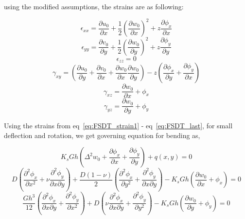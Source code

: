 using the modified assumptions, the strains are as following:

\begin{equation}
    \epsilon_{xx} = \frac{\partial u_0}{\partial x} + \frac{1}{2}(\frac{\partial w_0}{\partial x})^2 + z\frac{\partial\phi_x}{\partial x}
    \label{eq:FSDT_strain1}
\end{equation}
\begin{equation}
    \epsilon_{yy} = \frac{\partial v_0}{\partial y} + \frac{1}{2}(\frac{\partial w_0}{\partial y})^2 + z\frac{\partial\phi_y}{\partial y}
\end{equation}
\begin{equation}
    \epsilon_{zz} = 0
    \label{eq:strain_z_FSDT}
\end{equation}
\begin{equation}
    \gamma_{xy} = (\frac{\partial u_0}{\partial y} + \frac{\partial v_0}{\partial x} + \frac{\partial w_0}{\partial x}\frac{\partial w_0}{\partial y}) - z(\frac{\partial\phi_x}{\partial y} + \frac{\partial\phi_y}{\partial x})
\end{equation}
\begin{equation}
    \gamma_{xz} = \frac{\partial w_0}{\partial x} + \phi_x
\end{equation}
\begin{equation}
    \gamma_{yz} = \frac{\partial w_0}{\partial y} + \phi_y
    \label{eq:FSDT_last}
\end{equation}

Using the strains from eq~\ref{eq:FSDT_strain1} - eq~\ref{eq:FSDT_last}, for small deflection and rotation, we get governing equation for bending as,

\begin{equation}
    K_sGh(\Delta^2w_0 + \frac{\partial\phi_x}{\partial x} + \frac{\partial\phi_y}{\partial y}) + q(x, y) = 0
    \label{eq:gov_eq_FSDT1}
\end{equation}
\begin{equation}
    D(\frac{\partial^2\phi_x}{\partial x^2} + \nu\frac{\partial^2\phi_y}{\partial x\partial y}) + \frac{D(1 - \nu)}{2}(\frac{\partial^2\phi_x}{\partial y^2} + \frac{\partial^2\phi_y}{\partial x\partial y}) - K_sGh(\frac{\partial w_0}{\partial x} + \phi_x) = 0
\end{equation}
\begin{equation}
    \frac{Gh^3}{12}(\frac{\partial^2\phi_x}{\partial x\partial y} + \frac{\partial^2\phi_y}{\partial x^2}) + D(\nu\frac{\partial^2\phi_x}{\partial x\partial y} + \frac{\partial^2\phi_y}{\partial y^2}) - K_sGh(\frac{\partial w_0}{\partial y} + \phi_y) = 0
    \label{eq:gov_eq_FSDT3}
\end{equation}

